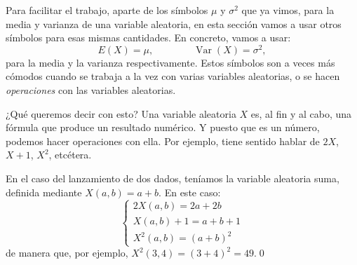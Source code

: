 Para facilitar el trabajo, aparte de los símbolos $\mu$ y $\sigma^2$ que ya vimos, para la media y varianza de una variable aleatoria, en esta sección vamos a usar otros símbolos para esas mismas cantidades. En concreto, vamos a usar:
    \[E(X)=\mu,\qquad \qquad \operatorname{Var}(X)=\sigma^2,\]
para la media y la varianza respectivamente. Estos símbolos son a veces más cómodos cuando se trabaja a la vez con varias variables aleatorias, o se hacen {\em operaciones} con las variables aleatorias.

¿Qué queremos decir con esto? Una variable aleatoria $X$ es, al fin y al cabo, una fórmula que produce un resultado numérico. Y puesto que es un número, podemos hacer operaciones con ella. Por ejemplo, tiene sentido hablar de $2X$, $X+1$, $X^2$, etcétera.
\begin{Ejemplo}
\label{cap04:ejem:OperacionesVariablesAleatorias01}
    En el caso del lanzamiento de dos dados, teníamos la variable aleatoria suma, definida mediante $X(a,b)=a+b$. En este caso:
    \[
    \begin{cases}
    2X(a,b)=2a+2b\\[2mm]
    X(a,b)+1=a+b+1\\[2mm]
    X^2(a,b)=(a+b)^2
    \end{cases}
    \]
    de manera que, por ejemplo, $X^2(3,4)=(3+4)^2=49$.\qed
\end{Ejemplo}

